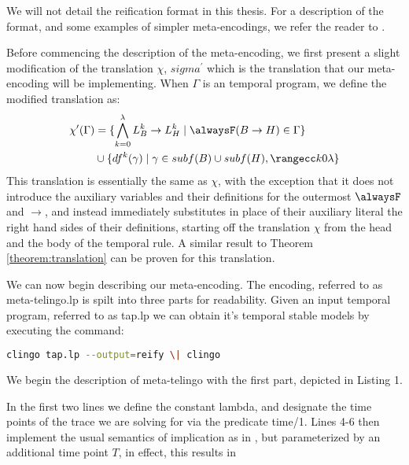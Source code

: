 We will not detail the reification format in this thesis. For a
description of the format, and some examples of simpler
meta-encodings, we refer the reader to \cite{karoscwa21a}.

Before commencing the description of the meta-encoding, we first
present a slight modification of the translation $\chi$,
$sigma^{\prime}$ which is the translation that our meta-encoding will
be implementing. When $\Gamma$ is an temporal program, we define the modified
translation as:
\begin{align*}
\chi^{\prime}(\Gamma) & = \{ \bigwedge_{k=0}^{\lambda} L_B^k
\rightarrow L_H^k \mid \alwaysF(B \rightarrow H) \in \Gamma \} \\
& \cup \{ df^k(\gamma) \mid \gamma \in subf(B) \cup subf(H), \kinlambda \}
\end{align*}
This translation is essentially the same as $\chi$, with the
exception that it does not introduce the auxiliary variables and their
definitions for the outermost $\alwaysF$ and $\rightarrow$, and
instead immediately substitutes in place of their auxiliary literal
the right hand sides of their definitions, starting off the
translation $\chi$ from the head and the body of the temporal rule. A similar
result to Theorem \ref{theorem:translation} can be proven for this
translation.

We can now begin describing our meta-encoding. The encoding, referred
to as meta-telingo.lp is spilt into three parts for readability. Given
an input temporal program, referred to as tap.lp we can obtain it's temporal stable
models by executing the command:

\begin{lstlisting}[language=bash,numbers=none]
clingo tap.lp --output=reify \| clingo
\end{lstlisting}

 We begin the description of meta-telingo with the first part,
 depicted in Listing 1.

 In the first two lines we define the constant lambda, and designate
 the time points of the trace we are solving for via the predicate
 time/1. Lines 4-6 then implement the usual semantics of implication
 as in \cite{karoscwa21a}, but parameterized by an additional time
 point $T$, in effect, this results in

